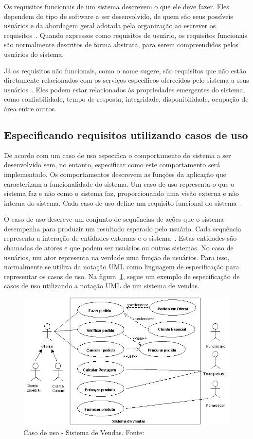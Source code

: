 Os requisitos funcionais de um sistema descrevem o que ele deve fazer.
Eles dependem do tipo de software a ser desenvolvido, de quem são seus possíveis usuários e da abordagem geral adotada pela organização ao escrever os requisitos~\cite{Sommerville}.
Quando expressos como requisitos de usuário, os requisitos funcionais são normalmente descritos de forma abstrata, para serem compreendidos pelos usuários do sistema.\label{texto:requisito_funcional}

Já os requisitos não funcionais, como o nome sugere, são requisitos que não estão diretamente relacionados com os serviços específicos oferecidos pelo sistema a seus usuários~\cite{Sommerville}.
Eles podem estar relacionados às propriedades emergentes do sistema, como confiabilidade, tempo de resposta, integridade, disponibilidade, ocupação de área entre outros.\label{texto:requisito_nao_funcional}

\subsection{Especificando requisitos utilizando casos de uso}

De acordo com  um caso de uso especifica o comportamento do sistema a ser desenvolvido sem, no entanto, especificar como este comportamento será implementado.
Os comportamentos descrevem as funções da aplicação que caracterizam a funcionalidade do sistema.
Um caso de uso representa o que o sistema faz e não como o sistema faz, proporcionando uma visão externa e não interna do sistema. Cada caso de uso define um requisito funcional do sistema~\cite{ReqJair}.

O caso de uso descreve um conjunto de sequências de ações que o sistema desempenha para produzir um resultado esperado pelo usuário.
Cada sequência representa a interação de entidades externas e o sistema~\cite{ReqJair}.
Estas entidades são chamadas de atores e que podem ser usuários ou outros sistemas.
No caso de usuários, um ator representa na verdade uma função de usuários. Para isso, normalmente se utiliza da notação UML como linguagem de especificação para representar os casos de uso. Na figura~\ref{cap:02:fig:caso-de-uso-exemplo}, segue um exemplo de especificação de casos de uso utilizando a notação UML de um sistema de vendas.

\begin{figure}
\centering
\includegraphics[width=0.7\linewidth]{src/imagens/casosd2.png}
\caption{Caso de uso - Sistema de Vendas. Fonte:~\cite{ReqJair2}}
\label{cap:02:fig:caso-de-uso-exemplo}
\end{figure}

